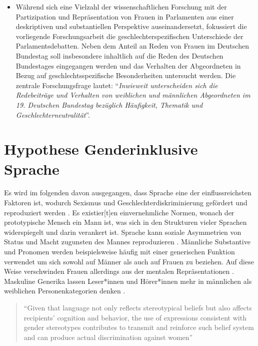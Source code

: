 \documentclass[12pt, 
    twoside=false, 
    bibliography=totoc, 
    numbers=endperiod, 
    headings=normal, 
    toc=chapterentrydotfill
    ]{scrbook}
\begin{document}
\begin{itemize}
\item Während sich eine Vielzahl der wissenschaftlichen Forschung mit der Partizipation und Repräsentation von Frauen in Parlamenten aus einer deskriptiven und substantiellen Perspektive auseinandersetzt, fokussiert die vorliegende Forschungsarbeit die geschlechterspezifischen Unterschiede der Parlamentsdebatten.
Neben dem Anteil an Reden von Frauen im Deutschen Bundestag soll insbesondere inhaltlich auf die Reden des Deutschen Bundestages eingegangen werden und das Verhalten der Abgeordneten in Bezug auf geschlechtsspezifische Besonderheiten untersucht werden. Die zentrale Forschungsfrage lautet: \enquote{\emph{Inwieweit unterscheiden sich die Redebeiträge und Verhalten von weiblichen und männlichen Abgeordneten im 19. Deutschen Bundestag bezüglich Häufigkeit, Thematik und Geschlechterneutralität}}.
\end{itemize}





\section{Hypothese Genderinklusive Sprache}


Es wird im folgenden davon ausgegangen, dass Sprache eine der einflussreichsten Faktoren ist, wodurch Sexismus und Geschlechterdiskriminierung gefördert und reproduziert werden \parencite*[1]{menegatti_2017}. Es existier[t]en einvernehmliche Normen, wonach der prototypische Mensch ein Mann ist, was sich in den Strukturen vieler Sprachen widerspiegelt und darin verankert ist. Sprache kann soziale Asymmetrien von Status und Macht zugunsten des Mannes reproduzieren \parencite{menegatti_2017}.
Männliche Substantive und Pronomen werden beispielsweise häufig mit einer generischen Funktion verwendet um sich sowohl auf Männer als auch auf Frauen zu beziehen. Auf diese Weise verschwinden Frauen allerdings aus der mentalen Repräsentationen \parencites{vaughan_2018}{stahlberg_2001}. Maskuline Generika lassen Leser*innen und Hörer*innen mehr in männlichen als weiblichen Personenkategorien denken \parencites[2]{sczesny_2016}{stahlberg_2007}.

\begin{quote}
    \enquote{Given that language not only reflects stereotypical beliefs but also affects recipients’ cognition and behavior, the use of expressions consistent with gender stereotypes contributes to transmit and reinforce such belief system and can produce actual discrimination against women} \parencite[2]{menegatti_2017}
\end{quote}
\end{document}
